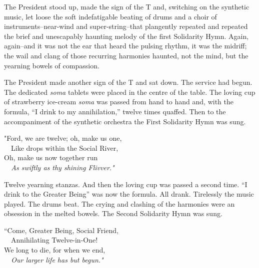 \documentclass[12pt]{report}
\begin{document}
The President stood up, made the sign of the T and, switching on the
synthetic music, let loose the soft indefatigable beating of drums and a
choir of instruments--near-wind and super-string--that plangently
repeated and repeated the brief and unescapably haunting melody of the
first Solidarity Hymn. Again, again--and it was not the ear that heard
the pulsing rhythm, it was the midriff; the wail and clang of those
recurring harmonies haunted, not the mind, but the yearning bowels of
compassion.

The President made another sign of the T and sat down. The service had
begun. The dedicated \emph{soma} tablets were placed in the centre of
the table. The loving cup of strawberry ice-cream \emph{soma} was passed
from hand to hand and, with the formula, ``I drink to my annihilation,''
twelve times quaffed. Then to the accompaniment of the synthetic
orchestra the First Solidarity Hymn was sung.

\emph{}

"Ford, we are twelve; oh, make us one,\\

~~Like drops within the Social River,\\

Oh, make us now together run\\

\emph{~~As swiftly as thy shining Flivver."\\
}

Twelve yearning stanzas. And then the loving cup was passed a second
time. ``I drink to the Greater Being'' was now the formula. All drank.
Tirelessly the music played. The drums beat. The crying and clashing of
the harmonies were an obsession in the melted bowels. The Second
Solidarity Hymn was sung.

\emph{}

``Come, Greater Being, Social Friend,\\

~~Annihilating Twelve-in-One!\\

We long to die, for when we end,\\

\emph{~~Our larger life has but begun."\\
}
\end{document}
